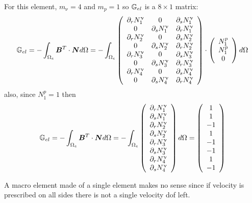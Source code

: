 For this element, $m_\upnu=4$ and $m_p=1$ so ${\mathbb{G}}_{el}$ is
a $8\times 1$ matrix:
\[
{\mathbb{G}}_{el} = -\int_{\Omega_e} {\bm B}^T \cdot {\bm N} d\Omega
= -\int_{\Omega_e}
\left(
\begin{array}{ccc}
\partial_r N_1^\upnu & 0 & \partial_s N_1^\upnu \\
0 & \partial_s N_1^\upnu & \partial_r N_1^\upnu \\
\partial_r N_2^\upnu & 0 & \partial_s N_2^\upnu \\
0 & \partial_s N_2^\upnu & \partial_r N_2^\upnu \\
\partial_r N_3^\upnu & 0 & \partial_s N_3^\upnu \\
0 & \partial_s N_3^\upnu & \partial_r N_3^\upnu \\
\partial_r N_4^\upnu & 0 & \partial_s N_4^\upnu \\
0 & \partial_s N_4^\upnu & \partial_r N_4^\upnu 
\end{array}
\right)
\cdot
\left(
\begin{array}{c}
N_1^p  \\ 
N_1^p  \\ 
0 
\end{array}
\right)
d\Omega
\]
also, since $N_1^p=1$ then 
\[
{\mathbb{G}}_{el} = -\int_{\Omega_e} {\bm B}^T \cdot {\bm N} d\Omega
= -\int_{\Omega_e}
\left(
\begin{array}{ccc}
\partial_r N_1^\upnu  \\
\partial_s N_1^\upnu  \\
\partial_r N_2^\upnu  \\
\partial_s N_2^\upnu  \\
\partial_r N_3^\upnu  \\
\partial_s N_3^\upnu  \\
\partial_r N_4^\upnu  \\
\partial_s N_4^\upnu  
\end{array}
\right)
d\Omega
=
\left(
\begin{array}{c}
 1\\
 1\\
-1\\
 1\\
-1\\
-1\\
 1\\
-1
\end{array}
\right)
\]

A macro element made of a single element makes no sense since if velocity 
is prescribed on all sides there is not a single velocity dof left.

